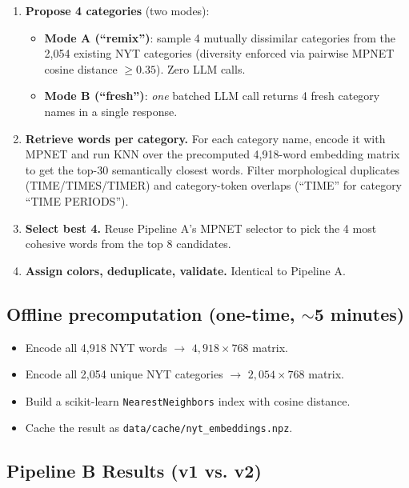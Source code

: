 \documentclass[11pt, letterpaper]{article}
\begin{document}
\begin{enumerate}[leftmargin=*, itemsep=0.15em]
\item \textbf{Propose 4 categories} (two modes):
    \begin{itemize}[itemsep=0.1em]
    \item \textbf{Mode A (``remix'')}: sample 4 mutually dissimilar categories from
    the 2,054 existing NYT categories (diversity enforced via pairwise MPNET cosine
    distance $\geq 0.35$). Zero LLM calls.
    \item \textbf{Mode B (``fresh'')}: \emph{one} batched LLM call returns 4 fresh
    category names in a single response.
    \end{itemize}
\item \textbf{Retrieve words per category.} For each category name, encode it with
MPNET and run KNN over the precomputed 4,918-word embedding matrix to get the top-30
semantically closest words. Filter morphological duplicates (TIME/TIMES/TIMER) and
category-token overlaps (``TIME'' for category ``TIME PERIODS'').
\item \textbf{Select best 4.} Reuse Pipeline A's MPNET selector to pick the 4 most
cohesive words from the top 8 candidates.
\item \textbf{Assign colors, deduplicate, validate.} Identical to Pipeline A.
\end{enumerate}

\subsection*{Offline precomputation (one-time, $\sim$5 minutes)}

\begin{itemize}[leftmargin=*, itemsep=0.1em]
\item Encode all 4{,}918 NYT words $\rightarrow$ $4{,}918 \times 768$ matrix.
\item Encode all 2{,}054 unique NYT categories $\rightarrow$ $2{,}054 \times 768$ matrix.
\item Build a scikit-learn \texttt{NearestNeighbors} index with cosine distance.
\item Cache the result as \texttt{data/cache/nyt\_embeddings.npz}.
\end{itemize}

\subsection*{Pipeline B Results (v1 vs. v2)}
\end{document}
